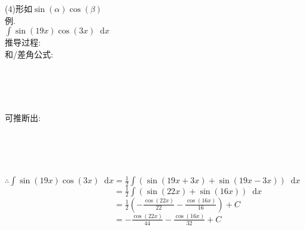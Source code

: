 \documentclass[UTF8, fontset=ubuntu]{ctexart}
\newcommand*{\dif}{\mathop{}\!\mathrm{d}}
\begin{document}
(4)形如$\sin(\alpha)\cos(\beta)$\\[1ex]
例.\\[1ex]
$\displaystyle\int\sin(19x)\cos(3x)\dif x$\\[1ex]
推导过程:\\[1ex]
和/差角公式:\\[-4ex]
\begin{center}
    \\[2ex]
    \\[2ex]
    \\[2ex]
\end{center}\vspace{1ex}
可推断出:\\[-4ex]
\begin{center}
	\\[2ex]
	\\[2ex]
	\\[2ex]
\end{center}\newpage
$\displaystyle\therefore\int\sin(19x)\cos(3x)\dif x=\frac{1}{2}\int(\sin(19x+3x)+\sin(19x-3x))\dif x$\\[1ex]
$\displaystyle\phantom{\therefore\int\sin(19x)\cos(3x)\dif x}=\frac{1}{2}\int(\sin(22x)+\sin(16x))\dif x$\\[1ex]
$\displaystyle\phantom{\therefore\int\sin(19x)\cos(3x)\dif x}=\frac{1}{2}\left(-\frac{\cos(22x)}{22}-\frac{\cos(16x)}{16}\right)+C$\\[1ex]
$\displaystyle\phantom{\therefore\int\sin(19x)\cos(3x)\dif x}=-\frac{\cos(22x)}{44}-\frac{\cos(16x)}{32}+C$\\[1ex]
\end{document}
